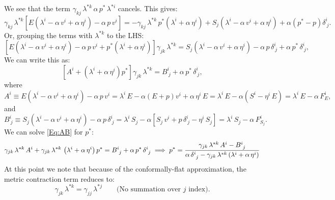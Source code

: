 \documentclass[10pt,preprint]{../aastex}
\begin{document}
We see that the term $\gamma_{kj}\,\lambda^{*k}\,\alpha\,p^{*}\,\lambda^{*i}$ cancels. This gives:
\begin{equation}
    \gamma_{kj}\,\lambda^{*k}\left[E\left(\lambda^{i}-\alpha\,v^{i}+\alpha\,\eta^{i}\right)-\alpha\,p\,v^{i}\right]=-\gamma_{kj}\,\lambda^{*k}\,p^{*}\left(\lambda^{i}+\alpha\,\eta^{i}\right)+S_{j}\left(\lambda^{i}-\alpha\,v^{i}+\alpha\,\eta^{i}\right)+\alpha\left(p^{*}-p\right)\delta^{i}_{~j}.
\end{equation}
Or, grouping the terms with $\lambda^{*k}$ to the LHS:
\begin{equation}
    \left[E\left(\lambda^{i}-\alpha\,v^{i}+\alpha\,\eta^{i}\right)-\alpha\,p\,v^{i}+p^{*}\left(\lambda^{i}+\alpha\,\eta^{i}\right)\right]\gamma_{jk}\,\lambda^{*k}=S_{j}\left(\lambda^{i}-\alpha\,v^{i}+\alpha\,\eta^{i}\right)-\alpha\,p\,\delta^{i}_{~j}+\alpha\,p^{*}\,\delta^{i}_{~j},
\end{equation}
We can write this as:
\begin{equation}\label{Eq:AB}
    \left[A^{i}+\left(\lambda^{i}+\alpha\,\eta^{i}\right)p^{*}\right]\gamma_{jk}\,\lambda^{*k}=B^{i}_{~j}+\alpha\,p^{*}\,\delta^{i}_{~j},
\end{equation}
where
\begin{equation}
    A^{i}\equiv E\left(\lambda^{i}-\alpha\,v^{i}+\alpha\,\eta^{i}\right)-\alpha\,p\,v^{i}=\lambda^{i}\,E-\alpha\left(E+p\right)v^{i}+\alpha\,\eta^{i}\,E=\lambda^{i}\,E-\alpha\left(S^{i}-\eta^{i}\,E\right)=\lambda^{i}\,E-\alpha\,F^{i}_{E},
\end{equation}
and
\begin{equation}
    B^{i}_{~j}\equiv S_{j}\left(\lambda^{i}-\alpha\,v^{i}+\alpha\,\eta^{i}\right)-\alpha\,p\,\delta^{i}_{~j}=\lambda^{i}\,S_{j}-\alpha\left[S_{j}\,v^{i}+p\,\delta^{i}_{~j}-\eta^{i}\,S_{j}\right]=\lambda^{i}\,S_{j}-\alpha\,F^{i}_{S_{j}}.
\end{equation}
We can solve \eqref{Eq:AB} for $p^{*}$:
\begin{equation}\label{Eq:p*}
  \gamma_{jk}\,\lambda^{*k}\,A^{i}+\gamma_{jk}\,\lambda^{*k}\,\left(\lambda^{i}+\alpha\,\eta^{i}\right)p^{*}=B^{i}_{~j}+\alpha\,p^{*}\,\delta^{i}_{~j}\implies p^{*}=\frac{\gamma_{jk}\,\lambda^{*k}\,A^{i}-B^{i}_{~j}}{\alpha\,\delta^{i}_{~j}-\gamma_{jk}\,\lambda^{*k}\left(\lambda^{i}+\alpha\,\eta^{i}\right)}
\end{equation}
At this point we note that because of the conformally-flat approximation, the metric contraction term reduces to:
\begin{equation}
    \gamma_{jk}\,\lambda^{*k}=\gamma_{jj}\,\lambda^{*j}\hspace{2em}\text{(No summation over $j$ index)}.
\end{equation}
\end{document}
